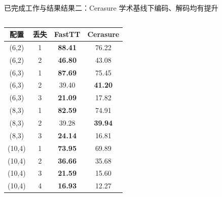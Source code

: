 \begin{frame}[t]{已完成工作与结果}{结果二：Cerasure 学术基线下编码、解码均有提升}
\begin{columns}[T,onlytextwidth]
        \vspace{0.15em}
        \scriptsize
        \setlength{\tabcolsep}{2.5pt}
        \renewcommand{\arraystretch}{0.86}
        \begin{tabular}{cccc}
            \toprule
            配置 & 丢失 & FastTT & Cerasure \\
            \midrule
            (6,2)  & 1 & \textbf{88.41} & 76.22 \\
            (6,2)  & 2 & \textbf{46.80} & 43.08 \\
            (6,3)  & 1 & \textbf{87.69} & 75.45 \\
            (6,3)  & 2 & 39.40 & \textbf{41.20} \\
            (6,3)  & 3 & \textbf{21.09} & 17.82 \\
            (8,3)  & 1 & \textbf{82.59} & 74.91 \\
            (8,3)  & 2 & 39.28 & \textbf{39.94} \\
            (8,3)  & 3 & \textbf{24.14} & 16.81 \\
            (10,4) & 1 & \textbf{73.95} & 69.89 \\
            (10,4) & 2 & \textbf{36.66} & 35.68 \\
            (10,4) & 3 & \textbf{21.59} & 15.60 \\
            (10,4) & 4 & \textbf{16.93} & 12.27 \\
            \bottomrule
        \end{tabular}
    \end{columns}

\end{frame}

